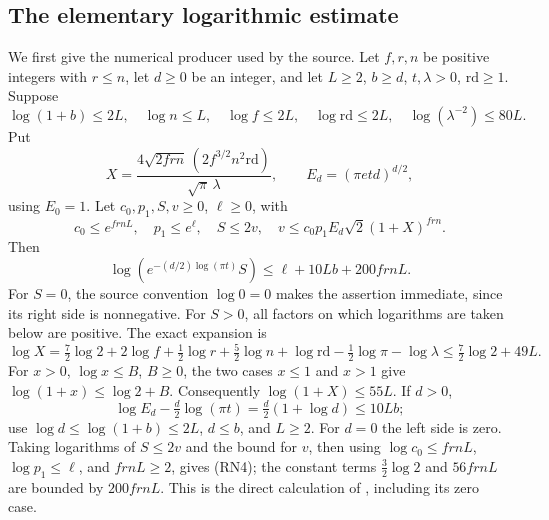 \subsection{The elementary logarithmic estimate}
We first give the numerical producer used by the source.
Let \(f,r,n\) be positive integers with \(r\le n\), let \(d\ge0\)
be an integer, and let \(L\ge2\), \(b\ge d\), \(t,\lambda>0\),
\(\mathrm{rd}\ge1\).  Suppose
\[
 \log(1+b)\le2L,\quad \log n\le L,\quad \log f\le2L,\quad
 \log\mathrm{rd}\le2L,\quad
 \log(\lambda^{-2})\le80L.
\]
Put
\[
 X=\frac{4\sqrt{2frn}\,(2f^{3/2}n^2\mathrm{rd})}
                      {\sqrt\pi\,\lambda},\qquad
 E_d=(\pi e t d)^{d/2},
\]
using \(E_0=1\).
Let \(c_0,p_1,S,v\ge0\), \(\ell\ge0\), with
\[
 c_0\le e^{frnL},\quad p_1\le e^\ell,\quad
 S\le2v,\quad
 v\le c_0p_1E_d\sqrt2(1+X)^{frn}.
\]
Then
\[
 \log\!\left(e^{-(d/2)\log(\pi t)}S\right)
                   \le \ell+10Lb+200frnL .
 \tag{RN4}\label{eq:sr-source-log-sup}
\]
For \(S=0\), the source convention \(\log0=0\) makes the assertion
immediate, since its right side is nonnegative.
For \(S>0\), all factors on which logarithms are taken below
are positive.
The exact expansion is
\[
 \log X=\tfrac72\log2+2\log f+\tfrac12\log r+
     \tfrac52\log n+\log\mathrm{rd}
                       -\tfrac12\log\pi-\log\lambda
                \le\tfrac72\log2+49L.
\]
For \(x>0\), \(\log x\le B\), \(B\ge0\), the two cases
\(x\le1\) and \(x>1\) give
\(\log(1+x)\le\log2+B\).
Consequently \(\log(1+X)\le55L\).
If \(d>0\),
\[
 \log E_d-\tfrac d2\log(\pi t)
       =\tfrac d2(1+\log d)\le10Lb;
\]
use \(\log d\le\log(1+b)\le2L\), \(d\le b\), and \(L\ge2\).
For \(d=0\) the left side is zero.
Taking logarithms of \(S\le2v\) and the bound for \(v\),
then using
\(\log c_0\le frnL\), \(\log p_1\le\ell\), and
\(frnL\ge2\), gives (RN4); the constant terms
\(\frac32\log2\) and \(56frnL\) are bounded by \(200frnL\).
This is the direct calculation of
, including its zero case.

